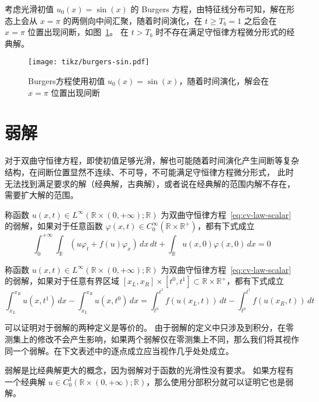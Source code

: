 考虑光滑初值 $u_0(x) = \sin(x)$ 的 Burgers 方程，由特征线分布可知，解在形态上会从 $x=\pi$ 的两侧向中间汇聚，随着时间演化，在 $t \ge T_b = 1$ 之后会在 $x=\pi$ 位置出现间断，如图~\ref{fig:burgers-sin}。
在 $t > T_b$ 时不存在满足守恒律方程微分形式的经典解。

\begin{figure}[htbp]
    \centering
    \texttt{[image: tikz/burgers-sin.pdf]}
    \caption{Burgers方程使用初值 $u_0(x) = \sin(x)$，随着时间演化，解会在 $x=\pi$ 位置出现间断} \label{fig:burgers-sin}
\end{figure}

\section{弱解}

对于双曲守恒律方程，即使初值足够光滑，解也可能随着时间演化产生间断等复杂结构，在间断位置显然不连续、不可导，不可能满足守恒律方程微分形式，
此时无法找到满足要求的解（经典解，古典解），或者说在经典解的范围内解不存在，需要扩大解的范围。

\begin{definition}[弱解定义之一]
    称函数 $u(x,t) \in L^\infty(\mathbb{R}\times(0,+\infty);\mathbb{R})$ 为双曲守恒律方程~\eqref{eq:cv-law-scalar} 的弱解，如果对于任意函数 $\varphi(x,t) \in C_0^\infty(\mathbb{R} \times \mathbb{R}^+)$，都有下式成立
    \[
        \int_{0}^{+\infty} \int_{\mathbb{R}} (u \varphi_t + f(u)\varphi_x)\,dx\,dt
        + \int_{\mathbb{R}} u(x,0)\varphi(x,0)\,dx = 0
    \]
\end{definition}

\begin{definition}[弱解定义之二]
    称函数 $u(x,t) \in L^\infty(\mathbb{R}\times(0,+\infty);\mathbb{R})$ 为双曲守恒律方程~\eqref{eq:cv-law-scalar} 的弱解，如果对于任意有界区域 $[x_L,x_R] \times [t^0,t^1] \subset \mathbb{R} \times \mathbb{R}^+$，都有下式成立
    \[
        \int_{x_L}^{x_R} u(x,t^1)\,dx - \int_{x_L}^{x_R} u(x,t^0)\,dx
        = \int_{t^0}^{t^1} f(u(x_L,t))\,dt - \int_{t^0}^{t^1} f(u(x_R,t))\,dt
    \]
\end{definition}

\begin{remark}
    可以证明对于弱解的两种定义是等价的。
    由于弱解的定义中只涉及到积分，在零测集上的修改不会产生影响，如果两个弱解仅在零测集上不同，那么我们将其视作同一个弱解。在下文表述中的逐点成立应当视作几乎处处成立。
\end{remark}

弱解是比经典解更大的概念，因为弱解对于函数的光滑性没有要求。
如果方程有一个经典解 $u \in C_0^1(\mathbb{R}\times(0,+\infty);\mathbb{R})$，那么使用分部积分就可以证明它也是弱解。

